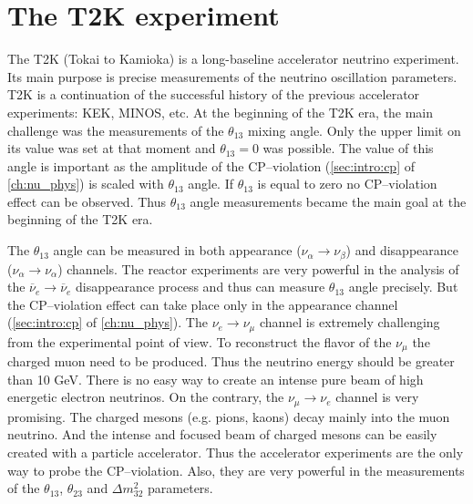\documentclass[../main.tex]{subfiles}
\begin{document}
\renewcommand{\labelitemi}{\ding{226}}
\renewcommand{\labelitemii}{\ding{227}}

\chapter{The T2K experiment}
\label{ch:T2K:general}

The T2K (Tokai to Kamioka) is a long-baseline accelerator neutrino experiment. Its main purpose is precise measurements of the neutrino oscillation parameters. T2K is a continuation of the successful history of the previous accelerator experiments: KEK, MINOS, etc. At the beginning of the T2K era, the main challenge was the measurements of the $\theta_{13}$ mixing angle. Only the upper limit on its value was set at that moment and $\theta_{13}=0$ was possible. The value of this angle is important as the amplitude of the CP--violation (\autoref{sec:intro:cp} of \autoref{ch:nu_phys}) is scaled with $\theta_{13}$ angle. If $\theta_{13}$ is equal to zero no CP--violation effect can be observed. Thus $\theta_{13}$ angle measurements became the main goal at the beginning of the T2K era.

The $\theta_{13}$ angle can be measured in both appearance ($\nu_\alpha\to\nu_\beta$) and disappearance ($\nu_\alpha\to\nu_\alpha$) channels. The reactor experiments are very powerful in the analysis of the $\overline{\nu}_e\to\overline{\nu}_e$ disappearance process and thus can measure $\theta_{13}$ angle precisely. But the CP--violation effect can take place only in the appearance channel (\autoref{sec:intro:cp} of \autoref{ch:nu_phys}). The $\nu_e\to\nu_\mu$ channel is extremely challenging from the experimental point of view. To reconstruct the flavor of the $\nu_\mu$ the charged muon need to be produced. Thus the neutrino energy should be greater than 10 GeV. There is no easy way to create an intense pure beam of high energetic electron neutrinos. On the contrary, the $\nu_\mu\to\nu_e$ channel is very promising. The charged mesons (e.g. pions, kaons) decay mainly into the muon neutrino. And the intense and focused beam of charged mesons can be easily created with a particle accelerator. Thus the accelerator experiments are the only way to probe the CP--violation. Also, they are very powerful in the measurements of the $\theta_{13}$, $\theta_{23}$ and $\Delta m^2_{32}$ parameters.
\end{document}
